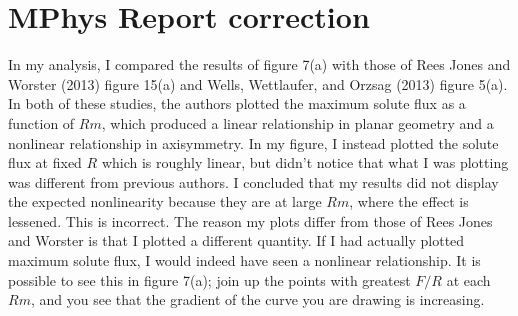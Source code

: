 \documentclass{article}
\begin{document}
\section*{MPhys Report correction}

In my analysis, I compared the results of figure 7(a) with those of Rees Jones and Worster (2013) figure 15(a) and Wells, Wettlaufer, and Orzsag (2013) figure 5(a). In both of these studies, the authors plotted the maximum solute flux as a function of $Rm$, which produced a linear relationship in planar geometry and a nonlinear relationship in axisymmetry. In my figure, I instead plotted the solute flux at fixed $R$ which is roughly linear, but didn't notice that what I was plotting was different from previous authors. I concluded that my results did not display the expected nonlinearity because they are at large $Rm$, where the effect is lessened. This is incorrect. The reason my plots differ from those of Rees Jones and Worster is that I plotted a different quantity. If I had actually plotted maximum solute flux, I would indeed have seen a nonlinear relationship. It is possible to see this in figure 7(a); join up the points with greatest $F/R$ at each $Rm$, and you see that the gradient of the curve you are drawing is increasing.
\end{document}
